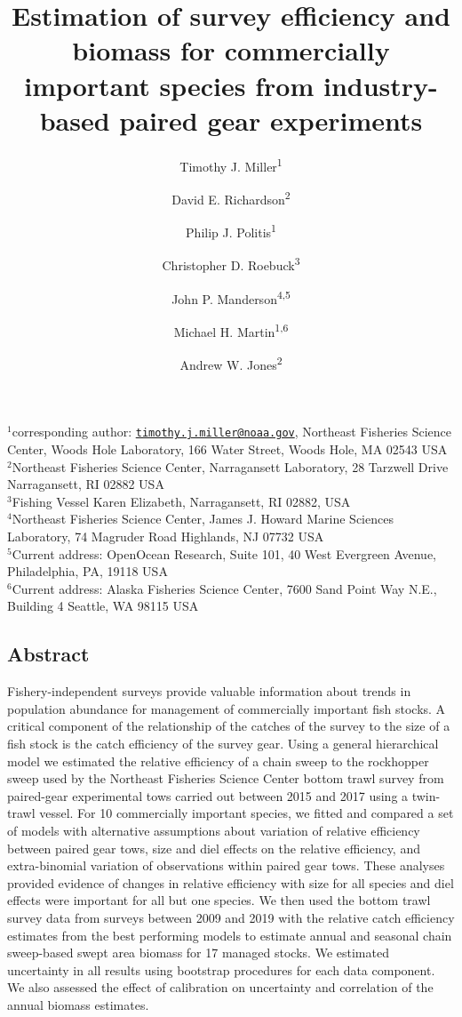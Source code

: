 \documentclass[
  12pt,
]{article}
\title{Estimation of survey efficiency and biomass for commercially
important species from industry-based paired gear experiments}
\author{Timothy J. Miller\textsuperscript{1} \and David E.
Richardson\textsuperscript{2} \and Philip J.
Politis\textsuperscript{1} \and Christopher D.
Roebuck\textsuperscript{3} \and John P.
Manderson\textsuperscript{4,5} \and Michael H.
Martin\textsuperscript{1,6} \and Andrew W. Jones\textsuperscript{2}}
\date{}
\begin{document}
\maketitle

\(^1\)corresponding author:
\href{mailto:timothy.j.miller@noaa.gov}{\nolinkurl{timothy.j.miller@noaa.gov}},
Northeast Fisheries Science Center, Woods Hole Laboratory, 166 Water
Street, Woods Hole, MA 02543 USA\\
\(^2\)Northeast Fisheries Science Center, Narragansett Laboratory, 28
Tarzwell Drive Narragansett, RI 02882 USA\\
\(^3\)Fishing Vessel Karen Elizabeth, Narragansett, RI 02882, USA\\
\(^4\)Northeast Fisheries Science Center, James J. Howard Marine
Sciences Laboratory, 74 Magruder Road Highlands, NJ 07732 USA\\
\(^5\)Current address: OpenOcean Research, Suite 101, 40 West Evergreen
Avenue, Philadelphia, PA, 19118 USA\\
\(^6\)Current address: Alaska Fisheries Science Center, 7600 Sand Point
Way N.E., Building 4 Seattle, WA 98115 USA

\pagebreak

\hypertarget{abstract}{%
\subsection*{Abstract}\label{abstract}}

Fishery-independent surveys provide valuable information about trends in
population abundance for management of commercially important fish
stocks. A critical component of the relationship of the catches of the
survey to the size of a fish stock is the catch efficiency of the survey
gear. Using a general hierarchical model we estimated the relative
efficiency of a chain sweep to the rockhopper sweep used by the
Northeast Fisheries Science Center bottom trawl survey from paired-gear
experimental tows carried out between 2015 and 2017 using a twin-trawl
vessel. For 10 commercially important species, we fitted and compared a
set of models with alternative assumptions about variation of relative
efficiency between paired gear tows, size and diel effects on the
relative efficiency, and extra-binomial variation of observations within
paired gear tows. These analyses provided evidence of changes in
relative efficiency with size for all species and diel effects were
important for all but one species. We then used the bottom trawl survey
data from surveys between 2009 and 2019 with the relative catch
efficiency estimates from the best performing models to estimate annual
and seasonal chain sweep-based swept area biomass for 17 managed stocks.
We estimated uncertainty in all results using bootstrap procedures for
each data component. We also assessed the effect of calibration on
uncertainty and correlation of the annual biomass estimates.
\end{document}
